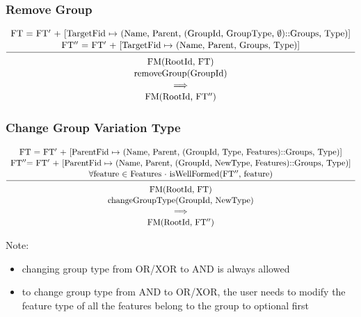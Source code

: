 \documentclass[a4paper,english]{ifimaster}
\begin{document}
\subsubsection*{Remove Group}
\begin{equation*}
\begin{array}{c}
\text{FT = FT$'$ + [TargetFid $\mapsto$ (Name, Parent, (GroupId, GroupType, $\emptyset$)::Groups, Type)]} \\[1pt]
\text{FT$''$ = FT$'$ + 
[TargetFid $\mapsto$ (Name, Parent, Groups, Type)]} \\[1pt]
\hline\\[-7pt]
\text{FM(RootId, FT)} \\[1pt]
\text{removeGroup(GroupId)}  \\[1pt]
\implies \\[1pt]
\text{FM(RootId, FT$''$)}
\end{array} 
\end{equation*}

\subsubsection*{Change Group Variation Type}
\begin{equation*}
\begin{array}{c}
\text{FT = FT$'$ + [ParentFid $\mapsto$ (Name, Parent, (GroupId, Type, Features)::Groups, Type)]} \\[1pt]
\text{FT$''$= FT$'$ + [ParentFid $\mapsto$ (Name, Parent, (GroupId, NewType, Features)::Groups, Type)]} \\[1pt]
\text{$\forall$feature $\in$ Features $\cdot$ isWellFormed(FT$''$, feature)} \\[1pt]
\hline\\[-7pt]
\text{FM(RootId, FT)} \\[1pt]
\text{changeGroupType(GroupId, NewType)}  \\[1pt]
\implies \\[1pt]
\text{FM(RootId, FT$''$)}
\end{array} 
\end{equation*} 

Note:
\begin{itemize}
	\item changing group type from OR/XOR to AND is always allowed
	\item to change group type from AND to OR/XOR, the user needs to modify the feature type of all the features belong to the group to optional first
\end{itemize}
\end{document}
